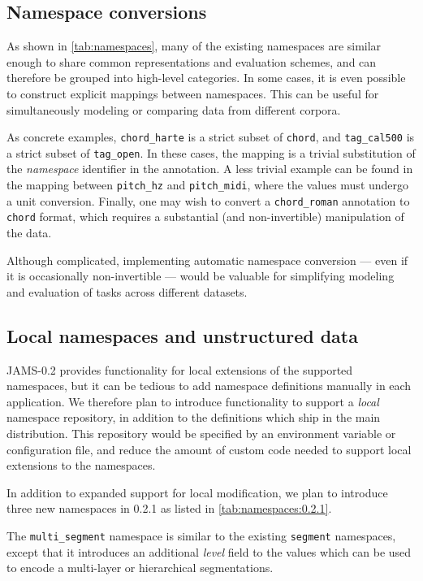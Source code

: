 \documentclass{article}
\begin{document}
\subsection{Namespace conversions}
As shown in \cref{tab:namespaces}, many of the existing namespaces are similar enough to
share common representations and evaluation schemes, and can therefore be grouped into
high-level categories.
In some cases, it is even possible to construct explicit mappings between namespaces.
This can be useful for simultaneously modeling or comparing data from different corpora.

As concrete examples, \texttt{chord\_harte} is a strict subset of \texttt{chord}, and
\texttt{tag\_cal500} is a strict subset of \texttt{tag\_open}.  In these cases, the mapping
is a trivial substitution of the \emph{namespace} identifier in the annotation.  A less
trivial example can be found in the mapping between \texttt{pitch\_hz} and
\texttt{pitch\_midi}, where the values must undergo a unit conversion.
Finally, one may wish to convert a \texttt{chord\_roman} annotation 
to \texttt{chord} format, which requires a substantial (and non-invertible) 
manipulation of the data.

Although complicated, implementing automatic namespace conversion --- even if it is
occasionally non-invertible --- would be valuable for simplifying modeling and
evaluation of tasks across different datasets.


\subsection{Local namespaces and unstructured data}
JAMS-0.2 provides functionality for local extensions of the supported namespaces, but it
can be tedious to add namespace definitions manually in each application.  We therefore
plan to introduce functionality to support a \emph{local} namespace repository, in
addition to the definitions which ship in the main distribution.  This repository would
be specified by an environment variable or configuration file, and reduce the amount of
custom code needed to support local extensions to the namespaces.

In addition to expanded support for local modification, we plan to introduce three new
namespaces in 0.2.1 as listed in \cref{tab:namespaces:0.2.1}.

The \texttt{multi\_segment} namespace is similar to the existing \texttt{segment} 
namespaces, except that it introduces an additional \emph{level} field to the values
which can be used to encode a multi-layer or hierarchical segmentations.
\end{document}
